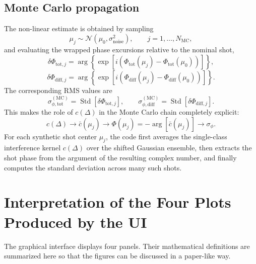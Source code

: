 \documentclass[11pt]{article}
\begin{document}
\subsection{Monte Carlo propagation}
The non-linear estimate is obtained by sampling
\begin{equation}
\mu_j\sim\mathcal{N}(\mu_0,\sigma_{\mathrm{noise}}^2),
\qquad j=1,\dots,N_{\mathrm{MC}},
\end{equation}
and evaluating the wrapped phase excursions relative to the nominal shot,
\begin{equation}
\delta\Phi_{\mathrm{tot},j}
=
\arg\!\left\{\exp\!\left[i\left(\Phi_{\mathrm{tot}}(\mu_j)-\Phi_{\mathrm{tot}}(\mu_0)\right)\right]\right\},
\label{eq:wrapped_total_excursion}
\end{equation}
\begin{equation}
\delta\Phi_{\mathrm{diff},j}
=
\arg\!\left\{\exp\!\left[i\left(\Phi_{\mathrm{diff}}(\mu_j)-\Phi_{\mathrm{diff}}(\mu_0)\right)\right]\right\}.
\label{eq:wrapped_diff_excursion}
\end{equation}
The corresponding RMS values are
\begin{equation}
\sigma_{\phi,\mathrm{tot}}^{(\mathrm{MC})}
=
\operatorname{Std}\!\left[\delta\Phi_{\mathrm{tot},j}\right],
\qquad
\sigma_{\phi,\mathrm{diff}}^{(\mathrm{MC})}
=
\operatorname{Std}\!\left[\delta\Phi_{\mathrm{diff},j}\right].
\label{eq:mc_noise_definitions}
\end{equation}
This makes the role of $c(\Delta)$ in the Monte Carlo chain completely explicit:
\begin{equation}
c(\Delta)
\longrightarrow
\bar c(\mu_j)
\longrightarrow
\Phi(\mu_j)=-\arg\!\left[\bar c(\mu_j)\right]
\longrightarrow
\sigma_\phi.
\label{eq:c_to_sigma_chain}
\end{equation}
For each synthetic shot center $\mu_j$, the code first averages the single-class interference kernel $c(\Delta)$ over the shifted Gaussian ensemble, then extracts the shot phase from the argument of the resulting complex number, and finally computes the standard deviation across many such shots.

\section{Interpretation of the Four Plots Produced by the UI}
The graphical interface displays four panels. Their mathematical definitions are summarized here so that the figures can be discussed in a paper-like way.
\end{document}
